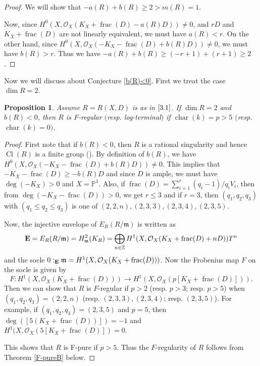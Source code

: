 \documentclass[12pt]{amsart}
\newtheorem{prop}[thm]{Proposition}
\theoremstyle{definition}
\theoremstyle{remark}
\numberwithin{equation}{section}
\DeclareMathOperator{\chr}{char}
\DeclareMathOperator{\FRC}{frac}
\DeclareMathOperator{\Cl}{Cl}
\newcommand{\m}{\mathfrak m}
\newcommand{\PP}{\mathbb P}
\newcommand{\Z}{\mathbb Z}
\newcommand{\cO}{\mathcal O}
\renewcommand{\:}{\colon}
\begin{document}
\begin{proof} We will show that 
$-a(R) + b(R)\ge 2 > m(R)=1$. 
\par
Now, since $H^0(X, \cO_X( K_X+ \FRC(D) - a(R)D))\ne 0$, and 
$rD$ and $K_X+ \FRC(D)$ are not linearly equivalent,
we must have  $a(R) < r$. 
 On the other hand, 
since $H^0(X, \cO_X( -K_X- \FRC(D) + b(R)D))\ne 0$,
we must have $b(R) > r$. Thus we have 
$-a(R) + b(R) \ge (-r +1)+ (r+1) \ge 2$.   
\end{proof} 

\par 
Now we will discuss about Conjecture \ref{b(R)<0}. 
First we treat the case $\dim R=2$. 

\begin{prop} Assume $R=R(X,D)$ is as in $\ref{3.1}$. 
If $\dim R=2$ and $b(R)<0$, 
then $R$ is F-regular $($resp. log-terminal$)$ 
if $\chr(k)=p > 5$ $($resp. $\chr(k)=0)$. 
\end{prop}
\begin{proof} 
First note that if $b(R)<0$, then $R$ is a rational singularity 
and hence 
$\Cl(R)$ is a finite group (\cite{Li}). 
By definition of $b(R)$, we have $H^0(X, \cO_X(-K_X - \FRC(D) +b(R)D)) \ne 0$. 
This implies that $-K_X -\FRC(D) \ge - b(R)D$ 
and since $D$ is ample,  
we must have $\deg( -K_X) > 0$ and $X = \PP^1$. 
Also, if $\FRC(D) =\sum_{i=1}^r (q_i-1)/q_i V_i$, 
then from $\deg(-K_X -\FRC(D))>0$, we get $r\le 3$ and if $r=3$, then $(q_1, q_2, q_3)$ 
with $(q_1\le q_2\le q_3)$ is one of $(2,2,n), (2,3,3), (2,3,4), (2,3,5)$. 
\par \vspace{1mm}
Now, the injective envelope of $E_R(R/\m)$ is written as  
\[
{\bf E}= E_R(R/\m) = H^2_{\m}(K_R) 
= \bigoplus_{n\in \Z}H^1(X, \cO_X(K_X + \FRC(D) + nD))T^n
\]
and the socle $0:_{\bf{E}} \m = H^1(X, \cO_X(K_X + \FRC(D)))$.
Now the Frobenius map $F$ on the socle is given by 
\[
F : H^1(X, \cO_X(K_X + \FRC(D))) \to H^1(X, \cO_X(p[K_X + \FRC(D)])).
\]
Then we can show that $R$ is $F$-regular if $p>2$ (resp. $p>3$; resp. $p>5$) 
when $(q_1,q_2,q_3)=(2,2,n)$ (resp. $(2,3,3), (2,3,4)$; resp. $(2,3,5)$).
For example, if  $(q_1,q_2,q_3)=(2,3,5)$ and $p=5$, then  
$\deg([5(K_X + \FRC(D))])=-1$ and $H^1(X, \cO_X(5[K_X + \FRC(D)])=0$.  
\par 
This shows that $R$ is F-pure if $p>5$. 
Thus the $F$-regularity of $R$ follows from Theorem \ref{F-pureB} below. 
\end{proof}
\end{document}
